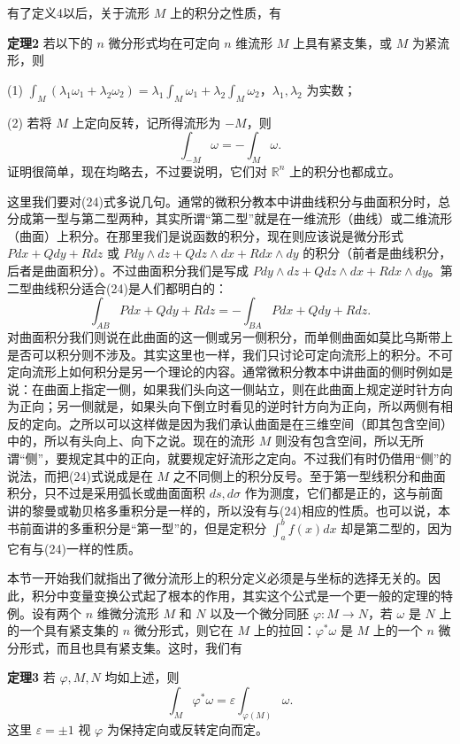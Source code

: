 有了定义4以后，关于流形 $M$ 上的积分之性质，有

\noindent\textbf{定理2}\quad
若以下的 $n$ 微分形式均在可定向 $n$ 维流形 $M$ 上具有紧支集，或 $M$ 为紧流形，则

(1) $\displaystyle \int_M(\lambda_1\omega_1+\lambda_2\omega_2)=\lambda_1\int_M\omega_1+\lambda_2\int_M\omega_2$，$\lambda_1,\lambda_2$ 为实数；

(2) 若将 $M$ 上定向反转，记所得流形为 $-M$，则
\begin{equation}
 \int_{-M}\omega=-\int_M\omega.
 \tag{24}
\end{equation}
证明很简单，现在均略去，不过要说明，它们对 $\mathbb R^n$ 上的积分也都成立。

这里我们要对(24)式多说几句。通常的微积分教本中讲曲线积分与曲面积分时，总分成第一型与第二型两种，其实所谓“第二型”就是在一维流形（曲线）或二维流形（曲面）上积分。在那里我们是说函数的积分，现在则应该说是微分形式 $Pdx+Qdy+Rdz$ 或 $Pdy\wedge dz+Qdz\wedge dx+Rdx\wedge dy$ 的积分（前者是曲线积分，后者是曲面积分）。不过曲面积分我们是写成 $Pdy\wedge dz+Qdz\wedge dx+Rdx\wedge dy$。第二型曲线积分适合(24)是人们都明白的：
\[
 \int_{AB}Pdx+Qdy+Rdz=-\int_{BA}Pdx+Qdy+Rdz.
\]
对曲面积分我们则说在此曲面的这一侧或另一侧积分，而单侧曲面如莫比乌斯带上是否可以积分则不涉及。其实这里也一样，我们只讨论可定向流形上的积分。不可定向流形上如何积分是另一个理论的内容。通常微积分教本中讲曲面的侧时例如是说：在曲面上指定一侧，如果我们头向这一侧站立，则在此曲面上规定逆时针方向为正向；另一侧就是，如果头向下倒立时看见的逆时针方向为正向，所以两侧有相反的定向。之所以可以这样做是因为我们承认曲面是在三维空间（即其包含空间）中的，所以有头向上、向下之说。现在的流形 $M$ 则没有包含空间，所以无所谓“侧”，要规定其中的正向，就要规定好流形之定向。不过我们有时仍借用“侧”的说法，而把(24)式说成是在 $M$ 之不同侧上的积分反号。至于第一型线积分和曲面积分，只不过是采用弧长或曲面面积 $ds,d\sigma$ 作为测度，它们都是正的，这与前面讲的黎曼或勒贝格多重积分是一样的，所以没有与(24)相应的性质。也可以说，本书前面讲的多重积分是“第一型”的，但是定积分 $\int_a^bf(x)dx$ 却是第二型的，因为它有与(24)一样的性质。

本节一开始我们就指出了微分流形上的积分定义必须是与坐标的选择无关的。因此，积分中变量变换公式起了根本的作用，其实这个公式是一个更一般的定理的特例。设有两个 $n$ 维微分流形 $M$ 和 $N$ 以及一个微分同胚 $\varphi:M\to N$，若 $\omega$ 是 $N$ 上的一个具有紧支集的 $n$ 微分形式，则它在 $M$ 上的拉回：$\varphi^*\omega$ 是 $M$ 上的一个 $n$ 微分形式，而且也具有紧支集。这时，我们有

\noindent\textbf{定理3}\quad
若 $\varphi,M,N$ 均如上述，则
\begin{equation}
 \int_M\varphi^*\omega=\varepsilon\int_{\varphi(M)}\omega.
 \tag{25}
\end{equation}
这里 $\varepsilon=\pm1$ 视 $\varphi$ 为保持定向或反转定向而定。

